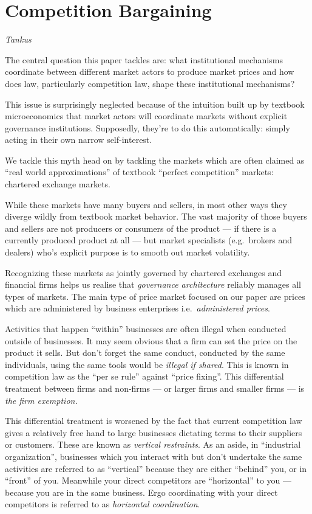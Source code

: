 \documentclass[
]{book}
\begin{document}
\hypertarget{competition-bargaining}{%
\section{Competition Bargaining}\label{competition-bargaining}}

\emph{Tankus}

The central question this paper tackles are: what institutional mechanisms coordinate between different market actors to produce market prices and how does law, particularly competition law, shape these institutional mechanisms?

This issue is surprisingly neglected because of the intuition built up by textbook microeconomics that market actors will coordinate markets without explicit governance institutions. Supposedly, they're to do this automatically: simply acting in their own narrow self-interest.

We tackle this myth head on by tackling the markets which are often claimed as ``real world approximations'' of textbook ``perfect competition'' markets: chartered exchange markets.

While these markets have many buyers and sellers, in most other ways they diverge wildly from textbook market behavior. The vast majority of those buyers and sellers are not producers or consumers of the product --- if there is a currently produced product at all --- but market specialists (e.g.~brokers and dealers) who's explicit purpose is to smooth out market volatility.

Recognizing these markets as jointly governed by chartered exchanges and financial firms helps us realise that \emph{governance architecture} reliably manages all types of markets.
The main type of price market focused on our paper are prices which are administered by business enterprises i.e.~\emph{administered prices}.

Activities that happen ``within'' businesses are often illegal when conducted outside of businesses. It may seem obvious that a firm can set the price on the product it sells. But don't forget the same conduct, conducted by the same individuals, using the same tools would be \emph{illegal if shared}.
This is known in competition law as the ``per se rule'' against ``price fixing''.
This differential treatment between firms and non-firms --- or larger firms and smaller firms --- is \emph{the firm exemption.}

This differential treatment is worsened by the fact that current competition law gives a relatively free hand to large businesses dictating terms to their suppliers or customers. These are known as \emph{vertical restraints}. As an aside, in ``industrial organization'', businesses which you interact with but don't undertake the same activities are referred to as ``vertical'' because they are either ``behind'' you, or in ``front'' of you. Meanwhile your direct competitors are ``horizontal'' to you --- because you are in the same business. Ergo coordinating with your direct competitors is referred to as \emph{horizontal coordination}.
\end{document}
